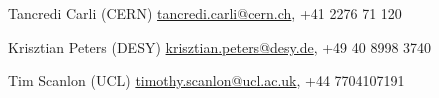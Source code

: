 
\begin{cvhonors}

      \cvhonor
        {Tancredi Carli (CERN)} %
        {\url{tancredi.carli@cern.ch}, +41 2276 71 120} %
        {} %
        {} %

    \cvhonor
        {Krisztian Peters (DESY)} %
        {\url{krisztian.peters@desy.de}, +49 40 8998 3740} %
        {} %
        {} %

    \cvhonor
        {Tim Scanlon (UCL)} %
        {\url{timothy.scanlon@ucl.ac.uk}, +44 7704107191} %
        {} %
        {} %
\end{cvhonors}
